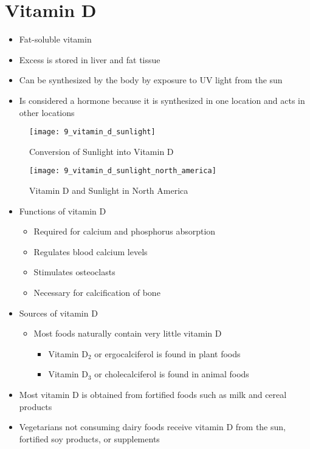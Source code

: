 \documentclass[title={Chapter 9}]{fdsn201notes}
\begin{document}
\section{Vitamin D}\label{sec:Vitamin D}
\begin{itemize}
	\item Fat-soluble vitamin
	\item Excess is stored in liver and fat tissue
	\item Can be synthesized by the body by exposure to UV light from the sun
	\item Is considered a hormone because it is synthesized in one location and acts in other locations
\end{itemize}

\begin{figure}[H]
	\centering
	\texttt{[image: 9\_vitamin\_d\_sunlight]}
	\caption{Conversion of Sunlight into Vitamin D}
	\label{fig:conversion-of-sunlight-into-vitamin-d}
\end{figure}

\begin{figure}[H]
	\centering
	\texttt{[image: 9\_vitamin\_d\_sunlight\_north\_america]}
	\caption{Vitamin D and Sunlight in North America}
	\label{fig:vitamin-d-sunlight-north-america}
\end{figure}

\begin{itemize}
	\item Functions of vitamin D
	\begin{itemize}
		\item Required for calcium and phosphorus absorption
		\item Regulates blood calcium levels
		\item Stimulates osteoclasts
		\item Necessary for calcification of bone
	\end{itemize}
	\item Sources of vitamin D
	\begin{itemize}
		\item Most foods naturally contain very little vitamin D
		\begin{itemize}
			\item Vitamin $\mbox{D}_{2}$ or ergocalciferol is found in plant foods
			\item Vitamin $\mbox{D}_{3}$ or cholecalciferol is found in animal foods
		\end{itemize}
	\end{itemize}
	\item Most vitamin D is obtained from fortified foods such as milk and cereal products
	\item Vegetarians not consuming dairy foods receive vitamin D from the sun, fortified soy products, or supplements
\end{itemize}
\end{document}
